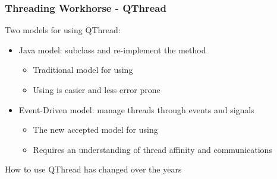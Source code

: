 
\begin{slide}
\frametitle{Threading Workhorse - QThread}

Two models for using QThread:
\begin{itemize}
\item Java model: subclass and re-implement the  method
  \begin{itemize}
  \item Traditional model for using 
  \item Using  is easier and less error prone
  \end{itemize}
\item Event-Driven model: manage threads through events and signals
  \begin{itemize}
  \item The new accepted model for using 
  \item Requires an understanding of thread affinity and communications
  \end{itemize}
\end{itemize}

\vspace{1em}
How to use QThread has changed over the years \\

\end{slide}


